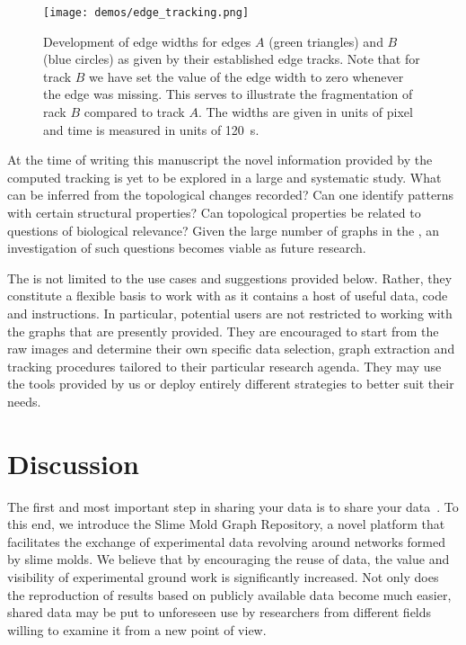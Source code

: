     \begin{figure}
		\centering
		\texttt{[image: demos/edge\_tracking.png]}%
		\caption{Development of edge widths for edges $A$ (green triangles) and $B$ (blue circles) as given by their established edge tracks. Note that for track $B$ we have set the value of the edge width to zero whenever the edge was missing. This serves to illustrate the fragmentation of rack $B$ compared to track $A$. The widths are given in units of pixel and time is measured in units of \SI{120}{\second}.}
		\label{fig:edge_tracking}%
    \end{figure}


	At the time of writing this manuscript the novel information provided by the computed tracking is yet to be explored in a large and systematic study. What can be inferred from the topological changes recorded? Can one identify patterns with certain structural properties? Can topological properties be related to questions of biological relevance? Given the large number of graphs in the \SMGR, an investigation of such questions becomes viable as future research.

	The \data is not limited to the use cases and suggestions provided below. Rather, they constitute a flexible basis to work with as it contains a host of useful data, code and instructions. In particular, potential users are not restricted to working with the graphs that are presently provided. They are encouraged to start from the raw images and determine their own specific data selection, graph extraction and tracking procedures tailored to their particular research agenda. They may use the tools provided by us or deploy entirely different strategies to better suit their needs.

\section{Discussion}

	The first and most important step in sharing your data is to share your data~\cite{white2013nine}. To this end, we introduce the Slime Mold Graph Repository, a novel platform that facilitates the exchange of experimental data revolving around networks formed by slime molds. We believe that by encouraging the reuse of data, the value and visibility of experimental ground work is significantly increased. Not only does the reproduction of results based on publicly available data become much easier, shared data may be put to unforeseen use by researchers from different fields willing to examine it from a new point of view.

